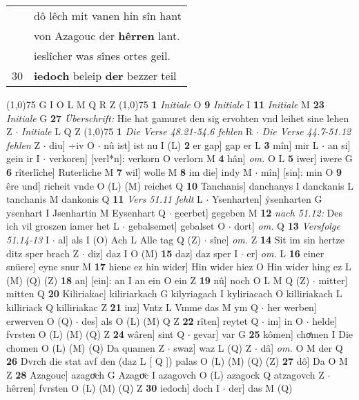 \documentclass[8pt,a4paper,notitlepage]{article}
\begin{document}
\begin{table}[ht]
\begin{minipage}[t]{0.5\linewidth}
\begin{tabular}{rl}
 & dô lêch mit vanen hin sîn hant\\ 
 & von Azagouc der \textbf{hêrren} lant.\\ 
 & ieslîcher was sînes ortes geil.\\ 
30 & \textbf{iedoch} beleip \textbf{der} bezzer teil\\ 
\end{tabular}
\scriptsize
\line(1,0){75} \newline
G I O L M Q R Z \newline
\line(1,0){75} \newline
\textbf{1} \textit{Initiale} O  \textbf{9} \textit{Initiale} I  \textbf{11} \textit{Initiale} M  \textbf{23} \textit{Initiale} G  \textbf{27} \textit{Überschrift:} Hie hat gamuret den sig ervohten vnd leihet sine lehen Z   $\cdot$ \textit{Initiale} L Q Z  \newline
\line(1,0){75} \newline
\textbf{1} \textit{Die Verse 48.21-54.6 fehlen} R   $\cdot$ \textit{Die Verse 44.7-51.12 fehlen} Z   $\cdot$ diu] ÷iv O  $\cdot$ nû ist] ist nu I (L) \textbf{2} er gap] gap er L \textbf{3} mîn] mir L  $\cdot$ an si] gein ir I  $\cdot$ verkoren] [verl*n]: verkorn O verlorn M \textbf{4} hân] \textit{om.} O L \textbf{5} iwer] iwere G \textbf{6} rîterlîche] Ruterliche M \textbf{7} wil] wolle M \textbf{8} im die] indy M  $\cdot$ mîn] [sin]: min O \textbf{9} êre und] richeit vnde O (L) (M) reichet Q \textbf{10} Tanchanis] danchanys I danckanis L tanchanis M dankonis Q \textbf{11} \textit{Vers 51.11 fehlt} L   $\cdot$ Ysenharten] ẏsenharten G ysenhart I Jsenhartin M Eysenhart Q  $\cdot$ geerbet] gegeben M \textbf{12} \textit{nach 51.12:} Des ich vil groszen iamer het L   $\cdot$ gebalsemet] gebalset O  $\cdot$ dort] \textit{om.} Q \textbf{13} \textit{Versfolge 51.14-13} I   $\cdot$ al] als I (O) Ach L Alle tag Q (Z)  $\cdot$ sîne] \textit{om.} Z \textbf{14} Sit im sin hertze ditz sper brach Z  $\cdot$ diz] daz I O (M) \textbf{15} daz] daz sper I  $\cdot$ er] \textit{om.} L \textbf{16} einer snüere] eyne snur M \textbf{17} hienc ez hin wider] Hin wider hiez O Hin wider hing ez L (M) (Q) (Z) \textbf{18} an] [ein]: an I an ein O ein Z \textbf{19} nû] noch O L M Q (Z)  $\cdot$ mitter] mitten Q \textbf{20} Kiliriakac] kiliriarkach G kilyriagach I kyliriacach O killiriakach L killiriack Q killiriakac Z \textbf{21} inz] Vntz L Vmme das M ym Q  $\cdot$ her werben] erwerven O (Q)  $\cdot$ des] als O (L) (M) Q Z \textbf{22} rîten] reytet Q  $\cdot$ im] in O  $\cdot$ helde] fvrsten O (L) (M) (Q) Z \textbf{24} wâren] sint Q  $\cdot$ gevar] var G \textbf{25} kômen] choͤmen I Die chomen O (L) (M) (Q) Da quamen Z  $\cdot$ swaz] waz L (Q) Z  $\cdot$ dâ] \textit{om.} O M der Q \textbf{26} Dvrch die stat avf den (daz L [ Q ]) palas O (L) (M) (Q) (Z) \textbf{27} dô] Da O M Z \textbf{28} Azagouc] azagoͮch G Azagoͮc I azagovch O (L) azagock Q atzagovch Z  $\cdot$ hêrren] fvrsten O (L) (M) (Q) Z \textbf{30} iedoch] doch I  $\cdot$ der] das M (Q) \newline

\end{minipage}
\end{table}
\end{document}

